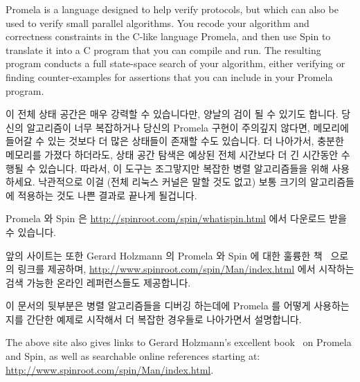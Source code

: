 Promela is a language designed to help verify protocols, but which
can also be used to verify small parallel algorithms.
You recode your algorithm and correctness constraints in the C-like
language Promela, and then use Spin to translate it into a C program
that you can compile and run.
The resulting program conducts a full state-space search of your
algorithm, either verifying or finding counter-examples for
assertions that you can include in your Promela program.
\fi

이 전체 상태 공간은 매우 강력할 수 있습니다만, 양날의 검이 될 수 있기도 합니다.
당신의 알고리즘이 너무 복잡하거나 당신의 Promela 구현이 주의깊지 않다면,
메모리에 들어갈 수 있는 것보다 더 많은 상태들이 존재할 수도 있습니다.
더 나아가서, 충분한 메모리를 가졌다 하더라도, 상태 공간 탐색은 예상된 전체
시간보다 더 긴 시간동안 수행될 수 있습니다.
따라서, 이 도구는 조그맣지만 복잡한 병렬 알고리즘들을 위해 사용하세요.
낙관적으로 이걸  (전체 리눅스 커널은 말할 것도 없고) 보통 크기의 알고리즘들에
적용하는 것도 나쁜 결과로 끝나게 될겁니다.

Promela 와 Spin 은 \url{http://spinroot.com/spin/whatispin.html} 에서 다운로드
받을 수 있습니다.
\iffalse

This full-state search can be extremely powerful, but can also be a two-edged
sword.
If your algorithm is too complex or your Promela implementation is
careless, there might be more states than fit in memory.
Furthermore, even given sufficient memory, the state-space search might
well run for longer than the expected lifetime of the universe.
Therefore, use this tool for compact but complex parallel algorithms.
Attempts to naively apply it to even moderate-scale algorithms (let alone
the full Linux kernel) will end badly.

Promela and Spin may be downloaded from
\url{http://spinroot.com/spin/whatispin.html}.
\fi

앞의 사이트는 또한 Gerard Holzmann 의 Promela 와 Spin 에 대한 훌륭한
책~\cite{Holzmann03a} 으로의 링크를 제공하며,
\url{http://www.spinroot.com/spin/Man/index.html} 에서 시작하는 검색 가능한
온라인 레퍼런스들도 제공합니다.

이 문서의 뒷부분은 병렬 알고리즘들을 디버깅 하는데에 Promela 를 어떻게
사용하는지를 간단한 예제로 시작해서 더 복잡한 경우들로 나아가면서 설명합니다.
\iffalse

The above site also gives links to Gerard Holzmann's excellent
book~\cite{Holzmann03a} on Promela and Spin,
as well as searchable online references starting at:
\url{http://www.spinroot.com/spin/Man/index.html}.

